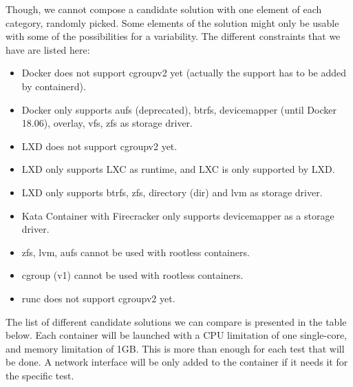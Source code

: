 Though, we cannot compose a candidate solution with one element of each category, randomly picked.  Some elements of the solution might only be usable with some of the possibilities for a variability.  The different constraints that we have are listed here:
\begin{itemize}
  \renewcommand\labelitemi{--}
  \item Docker does not support cgroupv2 yet (actually the support has to be added by containerd).
  \item Docker only supports aufs (deprecated), btrfs, devicemapper (until Docker 18.06), overlay, vfs, zfs as storage driver.
  \item LXD does not support cgroupv2 yet.
  \item LXD only supports LXC as runtime, and LXC is only supported by LXD.
  \item LXD only supports btrfs, zfs, directory (dir) and lvm as storage driver.
  \item Kata Container with Firecracker only supports devicemapper as a storage driver.
  \item zfs, lvm, aufs cannot be used with rootless containers.
  \item cgroup (v1) cannot be used with rootless containers.
  \item runc does not support cgroupv2 yet.
\end{itemize}

The list of different candidate solutions we can compare is presented in the table below.  Each container will be launched with a CPU limitation of one single-core, and memory limitation of 1GB.  This is more than enough for each test that will be done.  A network interface will be only added to the container if it needs it for the specific test.\\\\

